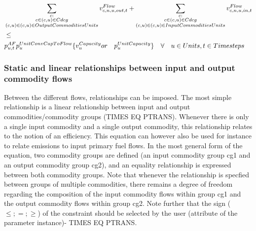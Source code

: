 
\begin{align} \label{eq:max_capacity}
&\sum_{\substack{\commodity :  \\ \commodity \in \Cdcg \\ (\commodity,\unit) \in \OutputCommoditiesUnits}} \vFlow[\commodity, \node, \unit, out, \timestep] + \sum_{\substack{\commodity :  \\ \commodity \in \Cdcg \\ (\commodity,\unit) \in \InputCommoditiesUnits}} \vFlow[\commodity, \node, \unit, in, \timestep] \nonumber \\
&  \le \nonumber \\
&\pAF \pUnitConvCapToFlow \{\vCapacity or \quad \pUnitCapacity\} \quad \forall \quad \units, \timesteps
\end{align}



\subsubsection{Static and linear relationships between input and output commodity flows}
Between the different flows, relationships can be imposed. The most simple relationship is a linear relationship between input and output commodities/commodity groups (TIMES EQ PTRANS). Whenever there is only a single input commodity and a single output commodity, this relationship relates to the notion of an efficiency. This equation can however also be used for instance to relate emissions to input primary fuel flows. In the most general form of the equation, two commodity groups are defined (an input commodity group cg1 and an output commodity group cg2), and an equality relationship is expressed between both commodity groups. Note that whenever the relationship is specfied between groups of multiple commodities, there remains a degree of freedom regarding the composition of the input commodity flows within group cg1 and the output commodity flows within group cg2. Note further that the sign ($\le;=;\ge$) of the constraint should be selected by the user (attribute of the parameter instance)- TIMES EQ PTRANS.

